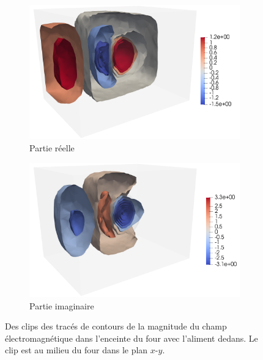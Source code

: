 \begin{figure}[H]
    \centering
    \begin{subfigure}{.5\textwidth}
        \centering
        \includegraphics[scale=0.15]{figures/helmholtz/helmholtz_reel3.png}
        \caption{Partie réelle}
    \end{subfigure}%
    \begin{subfigure}{.5\textwidth}
        \centering
        \includegraphics[scale=0.15]{figures/helmholtz/helmholtz_imag3.png}
        \caption{Partie imaginaire}
    \end{subfigure}
    \caption{Des clips des tracés de contours de la magnitude du champ
    électromagnétique dans l'enceinte du four avec l'aliment dedans.
    Le clip est au milieu du four dans le plan $x\text{-}y$.}
\end{figure}
